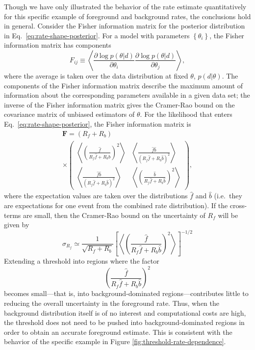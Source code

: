 \documentclass[aps,prd,reprint,nofootinbib]{revtex4-1}
\newcommand{\mathset}[1]{\left\{ #1 \right\}}
\begin{document}
Though we have only illustrated the behavior of the rate estimate
quantitatively for this specific example of foreground and background
rates, the conclusions hold in general.  Consider the Fisher
information matrix for the posterior distribution in
Eq.~\eqref{eq:rate-shape-posterior}.  For a model with parameters
$\mathset{\theta_i}$, the Fisher information matrix has components
\begin{equation}
  F_{ij} \equiv \left\langle \frac{\partial \log p\left( \theta | d
    \right)}{\partial \theta_i} \frac{\partial \log p\left( \theta | d
    \right)}{\partial \theta_j} \right\rangle,
\end{equation}
where the average is taken over the data distribution at fixed
$\theta$, $p(d | \theta)$.  The components of the Fisher information
matrix describe the maximum amount of information about the
corresponding parameters available in a given data set; the inverse of
the Fisher information matrix gives the Cramer-Rao bound on the
covariance matrix of unbiased estimators of $\theta$.  For the
likelihood that enters Eq.~\eqref{eq:rate-shape-posterior}, the Fisher
information matrix is 
\begin{multline}
  \mathbf{F} = \left( R_f + R_b \right) \\ \times \begin{pmatrix}
    \left \langle \left(\frac{\hat{f}}{R_f \hat{f} + R_b \hat{b}}\right)^2 \right
    \rangle & \left \langle \frac{\hat{f} \hat{b}}{\left( R_f \hat{f}
      + R_b \hat{b} \right)^2} \right\rangle \\
    \left \langle \frac{\hat{f} \hat{b}}{\left( R_f \hat{f}
      + R_b \hat{b} \right)^2} \right\rangle & \left \langle
    \left(\frac{\hat{b}}{R_f \hat{f} + R_b \hat{b}}\right)^2 \right 
    \rangle
  \end{pmatrix},
\end{multline}
where the expectation values are taken over the distributions
$\hat{f}$ and $\hat{b}$ (i.e.\ they are expectations for one event
from the combined rate distribution).  If the cross-terms are small,
then the Cramer-Rao bound on the uncertainty of $R_f$ will be given by
\begin{equation}
  \sigma_{R_f} \simeq \frac{1}{\sqrt{R_f + R_b}} \left[ \left\langle \left(
    \frac{\hat{f}}{R_f \hat{f} + R_b \hat{b}} \right)^2 \right\rangle\right]^{-1/2}
\end{equation}
Extending a threshold into regions where the factor 
\begin{equation}
  \left( \frac{\hat{f}}{R_f \hat{f} + R_b \hat{b}} \right)^2
\end{equation}
becomes small---that is, into background-dominated
regions---contributes little to reducing the overall uncertainty in the
foreground rate.  Thus, when the background distribution itself is of no interest and computational costs are high, the threshold does not need to be pushed into background-dominated regions in order to obtain an accurate foreground estimate. This is consistent with the behavior of the specific
example in Figure \ref{fig:threshold-rate-dependence}.  
\end{document}
